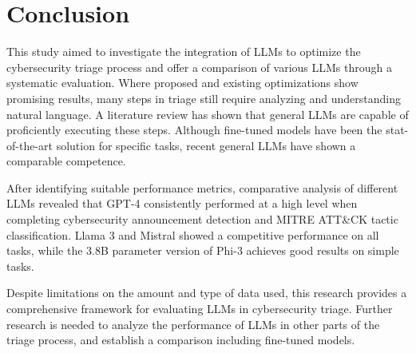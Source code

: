 \section{Conclusion}
\label{sec:conclusion}

This study aimed to investigate the integration of LLMs to optimize the cybersecurity triage process and offer a
comparison of various LLMs through a systematic evaluation.
Where proposed and existing optimizations show promising results, many steps in triage still require analyzing and
understanding natural language.
A literature review has shown that general LLMs are capable of proficiently executing these steps.
Although fine-tuned models have been the stat-of-the-art solution for specific tasks, recent general LLMs have shown a
comparable competence.

After identifying suitable performance metrics, comparative analysis of different LLMs revealed that GPT-4
consistently performed at a high level when completing cybersecurity announcement detection and MITRE ATT\&CK tactic
classification.
Llama 3 and Mistral showed a competitive performance on all tasks, while the 3.8B parameter version of Phi-3
achieves good results on simple tasks.

Despite limitations on the amount and type of data used, this research provides a comprehensive framework for
evaluating LLMs in cybersecurity triage.
Further research is needed to analyze the performance of LLMs in other parts of the triage process, and establish a
comparison including fine-tuned models.
